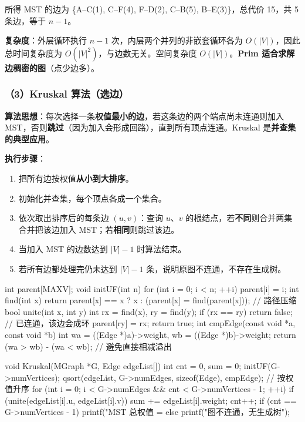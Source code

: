 \documentclass[11pt,openany,UTF8]{ctexbook}
\begin{document}
所得 MST 的边为 \{A–C(1), C–F(4), F–D(2), C–B(5), B–E(3)\}，总代价 15，共 5 条边，等于 $n-1$。

\textbf{复杂度}：外层循环执行 $n-1$ 次，内层两个并列的非嵌套循环各为 $O(|V|)$，因此总时间复杂度为 $O(|V|^{2})$，与边数无关。空间复杂度 $O(|V|)$。\textbf{Prim 适合求解边稠密的图}（点少边多）。

\subsubsection{（3）Kruskal 算法（选边）}

\textbf{算法思想}：每次选择一条\textbf{权值最小的边}，若这条边的两个端点尚未连通则加入 MST，否则\textbf{跳过}（因为加入会形成回路），直到所有顶点连通。Kruskal 是\textbf{并查集的典型应用}。

\textbf{执行步骤}：

\begin{enumerate}
\item 把所有边按权值\textbf{从小到大排序}。
\item 初始化并查集，每个顶点各成一个集合。
\item 依次取出排序后的每条边 $(u,v)$：查询 $u$、$v$ 的根结点，若\textbf{不同}则合并两集合并把该边加入 MST；若\textbf{相同}则跳过该边。
\item 当加入 MST 的边数达到 $|V|-1$ 时算法结束。
\item 若所有边都处理完仍未达到 $|V|-1$ 条，说明原图不连通，不存在生成树。
\end{enumerate}
\begin{codebox}
int parent[MAXV];
void initUF(int n) { for (int i = 0; i < n; ++i) parent[i] = i; }
int find(int x) { return parent[x] == x ? x : (parent[x] = find(parent[x])); }  // 路径压缩
bool unite(int x, int y) {
    int rx = find(x), ry = find(y);
    if (rx == ry) return false;      // 已连通，该边会成环
    parent[ry] = rx;
    return true;
}
int cmpEdge(const void *a, const void *b) {
    int wa = ((Edge *)a)->weight, wb = ((Edge *)b)->weight;
    return (wa > wb) - (wa < wb);    // 避免直接相减溢出
}

void Kruskal(MGraph *G, Edge edgeList[]) {
    int cnt = 0, sum = 0;
    initUF(G->numVertices);
    qsort(edgeList, G->numEdges, sizeof(Edge), cmpEdge);   // 按权值升序
    for (int i = 0; i < G->numEdges && cnt < G->numVertices - 1; ++i) {
        if (unite(edgeList[i].u, edgeList[i].v)) {
            sum += edgeList[i].weight;
            cnt++;
        }
    }
    if (cnt == G->numVertices - 1) printf("MST 总权值 = %
    else printf("图不连通，无生成树\n");
}
\end{codebox}
\end{document}
